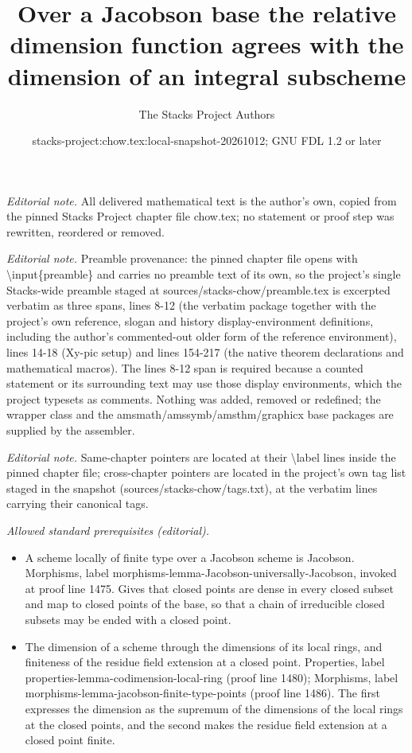 \documentclass[10pt,a4paper]{amsart}
\title{Over a Jacobson base the relative dimension function agrees with the dimension of an integral subscheme}
\author{The Stacks Project Authors}
\date{stacks-project:chow.tex:local-snapshot-20261012; GNU FDL 1.2 or later}
\theoremstyle{plain}
\theoremstyle{definition}
\theoremstyle{remark}
\numberwithin{equation}{subsection}
\begin{document}
\maketitle
\noindent\textit{Editorial note.} All delivered mathematical text is the author's own, copied from the pinned Stacks Project chapter file chow.tex; no statement or proof step was rewritten, reordered or removed.\par\medskip
\noindent\textit{Editorial note.} Preamble provenance: the pinned chapter file opens with \textbackslash{}input\{preamble\} and carries no preamble text of its own, so the project's single Stacks-wide preamble staged at sources/stacks-chow/preamble.tex is excerpted verbatim as three spans, lines 8-12 (the verbatim package together with the project's own reference, slogan and history display-environment definitions, including the author's commented-out older form of the reference environment), lines 14-18 (Xy-pic setup) and lines 154-217 (the native theorem declarations and mathematical macros). The lines 8-12 span is required because a counted statement or its surrounding text may use those display environments, which the project typesets as comments. Nothing was added, removed or redefined; the wrapper class and the amsmath/amssymb/amsthm/graphicx base packages are supplied by the assembler.\par\medskip
\noindent\textit{Editorial note.} Same-chapter pointers are located at their \textbackslash{}label lines inside the pinned chapter file; cross-chapter pointers are located in the project's own tag list staged in the snapshot (sources/stacks-chow/tags.txt), at the verbatim lines carrying their canonical tags.\par\medskip
\noindent\textit{Allowed standard prerequisites (editorial).}\begin{itemize}
\item A scheme locally of finite type over a Jacobson scheme is Jacobson. Morphisms, label morphisms-lemma-Jacobson-universally-Jacobson, invoked at proof line 1475. Gives that closed points are dense in every closed subset and map to closed points of the base, so that a chain of irreducible closed subsets may be ended with a closed point.
\item The dimension of a scheme through the dimensions of its local rings, and finiteness of the residue field extension at a closed point. Properties, label properties-lemma-codimension-local-ring (proof line 1480); Morphisms, label morphisms-lemma-jacobson-finite-type-points (proof line 1486). The first expresses the dimension as the supremum of the dimensions of the local rings at the closed points, and the second makes the residue field extension at a closed point finite.
\end{itemize}\medskip
\end{document}
